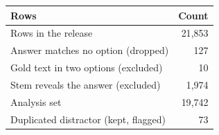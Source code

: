 \begin{tabular}{lr}
\toprule
Rows & Count \\
\midrule
Rows in the release & 21{,}853 \\
Answer matches no option (dropped) & 127 \\
Gold text in two options (excluded) & 10 \\
Stem reveals the answer (excluded) & 1{,}974 \\
Analysis set & 19{,}742 \\
Duplicated distractor (kept, flagged) & 73 \\
\bottomrule
\end{tabular}
